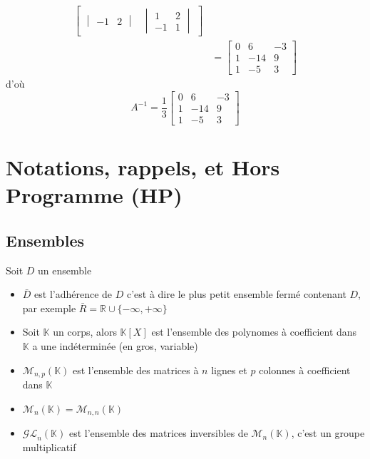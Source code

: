 \documentclass[11pt,colorlinks]{book}
\theoremstyle{mytheoremstyle}
\theoremstyle{mytheoremstyle}
\theoremstyle{mytheoremstyle}
\theoremstyle{mytheoremstyle}
\theoremstyle{mytheoremstyle}
\theoremstyle{mytheoremstyle}
\theoremstyle{mytheoremstyle}
\theoremstyle{mytheoremstyle}
\theoremstyle{myproblemstyle}
\def\mbb#1{\mathbb{#1}}
\def\mfc#1{\mathcal{#1}}
\def\bR{\mbb{R}}
\def\bK{\mbb{K}}
\begin{document}
\begin{ex}
\begin{align*}
\begin{bmatrix}
\begin{vmatrix}
        -1 & 2
      \end{vmatrix}&
      \begin{vmatrix}
        1 & 2 \\ 
        -1 & 1
      \end{vmatrix}
    \end{bmatrix} \\ 
    &= \begin{bmatrix}
      0 & 6 & -3 \\ 
      1 & -14 & 9 \\ 
      1 & -5 & 3
    \end{bmatrix}
  \end{align*}
  d'où 
  \begin{equation*}
    A^{-1} = \frac{1}{3}
    \begin{bmatrix}
      0 & 6 & -3 \\ 
      1 & -14 & 9 \\ 
      1 & -5 & 3
    \end{bmatrix}
  \end{equation*}
\end{ex}

\chapter{Notations, rappels, et Hors Programme (HP)}
\section{Ensembles}
\begin{rmq}
  Soit $D$ un ensemble
  \begin{itemize}
    \item $\bar{D}$ est l'adhérence de $D$ c'est à dire le plus 
    petit ensemble fermé contenant $D$, par exemple $\bar{R} = \bR \cup \{-\infty,+\infty\}$
    \item Soit $\bK$ un corps, alors $\bK[X]$ est l'ensemble des polynomes 
    à coefficient dans $\bK$ a une indéterminée (en gros, variable)
    \item $\mfc{M}_{n,p}(\bK)$ est l'ensemble des matrices à $n$ lignes et $p$ colonnes à coefficient dans $\bK$
    \item $\mfc{M}_{n}(\bK) = \mfc{M}_{n,n}(\bK)$
    \item $\mfc{GL}_n(\bK)$ est l'ensemble des matrices inversibles de $\mfc{M}_n(\bK)$, c'est un groupe multiplicatif
  \end{itemize}
\end{rmq}
\end{document}
